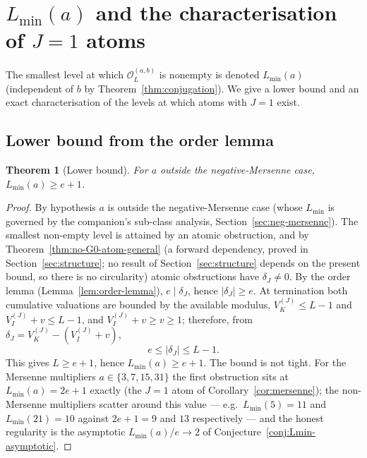 \documentclass[11pt,reqno]{amsart}
\theoremstyle{plain}
\newtheorem{theorem}{Theorem}[section]
\theoremstyle{definition}
\theoremstyle{remark}
\newcommand{\Obs}{\mathcal{O}}
\newcommand{\Vk}{V_{K}}
\newcommand{\Vi}{V_{I}}
\newcommand{\Obsab}{\Obs_{L}^{(a,b)}}
\begin{document}
\section{\texorpdfstring{$L_{\min}(a)$}{Lmin(a)} and the characterisation of \texorpdfstring{$J = 1$}{J=1} atoms}\label{sec:Lmin}

The smallest level at which $\Obsab$ is nonempty is denoted $L_{\min}(a)$
(independent of $b$ by Theorem~\ref{thm:conjugation}). We give a
lower bound and an exact characterisation of the levels at which atoms
with $J = 1$ exist.

\subsection{Lower bound from the order lemma}

\begin{theorem}[Lower bound]\label{thm:Lmin-lower}
For $a$ outside the negative-Mersenne case, $L_{\min}(a) \ge e + 1$.
\end{theorem}

\begin{proof}
By hypothesis $a$ is outside the negative-Mersenne case (whose
$L_{\min}$ is governed by the companion's sub-class analysis,
Section~\ref{sec:neg-mersenne}). The smallest non-empty level is
attained by an atomic obstruction, and
by Theorem~\ref{thm:no-G0-atom-general} (a forward dependency, proved in
Section~\ref{sec:structure}; no result of Section~\ref{sec:structure}
depends on the present bound, so there is no circularity) atomic
obstructions have $\delta_J \ne 0$. By the order lemma
(Lemma~\ref{lem:order-lemma}), $e \mid \delta_J$, hence
$\lvert \delta_J \rvert \ge e$. At termination both cumulative
valuations are bounded by the available modulus,
$\Vk^{(J)} \le L - 1$ and $\Vi^{(J)} + v \le L - 1$, and
$\Vi^{(J)} + v \ge v \ge 1$; therefore, from
$\delta_J = \Vk^{(J)} - (\Vi^{(J)} + v)$,
\[
e \le \lvert \delta_J \rvert \le L - 1.
\]
This gives $L \ge e + 1$, hence $L_{\min}(a) \ge e + 1$. The bound is
not tight. For the Mersenne multipliers $a \in \{3, 7, 15, 31\}$ the
first obstruction sits at $L_{\min}(a) = 2e + 1$ exactly (the $J = 1$
atom of Corollary~\ref{cor:mersenne}); the non-Mersenne multipliers
scatter around this value --- e.g.\ $L_{\min}(5) = 11$ and
$L_{\min}(21) = 10$ against $2e + 1 = 9$ and $13$ respectively --- and the
honest regularity is the asymptotic $L_{\min}(a)/e \to 2$ of
Conjecture~\ref{conj:Lmin-asymptotic}. \qedhere
\end{proof}
\end{document}
